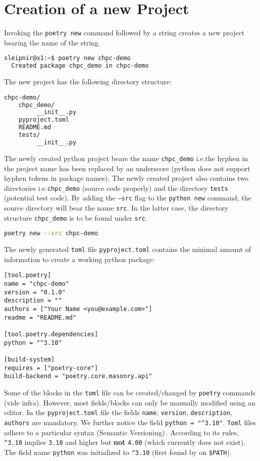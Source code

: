 \documentclass[10pt]{article}
\begin{document}
\section{Creation of a new Project}
Invoking the \texttt{poetry new} command followed by a string creates a new project bearing the name of the string.
\begin{lstlisting}[language=bash]
sleipnir@x1:~$ poetry new chpc-demo
  Created package chpc_demo in chpc-demo
\end{lstlisting}
The new project has the following directory structure:
\begin{lstlisting}[language=bash]
chpc-demo/
    chpc_demo/
         __init__.py
    pyproject.toml
    README.md
    tests/
         __init__.py
\end{lstlisting}
The newly created python project bears the name \texttt{chpc\_demo} i.e.\;the hyphen in the project name has been 
replaced by an underscore (python does not support hyphen tokens in package names).
The newly created project also contains two directories i.e.\;\texttt{chpc\_demo} (source code properly) and 
the directory \texttt{tests} (potential test code). By adding the \texttt{--src} flag to the 
\lstinline[language=bash]{python new} command, the source directory will bear the name \texttt{src}. 
In the latter case, the directory structure \texttt{chpc\_demo} is to be found 
under \texttt{src}. 
\begin{lstlisting}[language=bash]
poetry new --src chpc-demo
\end{lstlisting}
The newly generated \texttt{toml}\cite{TOML:2023} file \texttt{pyproject.toml} contains the minimal amount of information to create a working python package:
\begin{verbatim}
[tool.poetry]
name = "chpc-demo"
version = "0.1.0"
description = ""
authors = ["Your Name <you@example.com>"]
readme = "README.md"

[tool.poetry.dependencies]
python = "^3.10"

[build-system]
requires = ["poetry-core"]
build-backend = "poetry.core.masonry.api"
\end{verbatim}	
Some of the blocks in the \texttt{toml} file can be created/changed by
\texttt{poetry} commands (vide infra). However, most fields/blocks can only be manually modified using an editor. 
In the \texttt{pyproject.toml} file the fields \texttt{name}, \texttt{version}, \texttt{description}, \texttt{authors} are mandatory.
We further notice the field \texttt{python = "\textasciicircum3.10"}. \texttt{Toml} files adhere to a particular syntax (Semantic Versioning)\,\cite{SEMANVER:2023}.
According to its rules, 
\texttt{\textasciicircum3.10} implies \texttt{3.10} and higher but \textbf{not} \texttt{4.00} (which currently does not exist). 
The field name \texttt{python} was initialized to \texttt{\textasciicircum3.10} (first found by on \texttt{\$PATH}).
\end{document}
